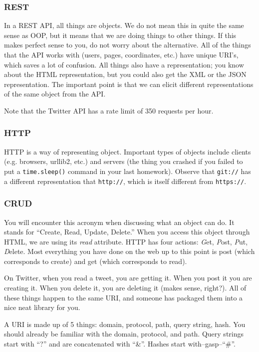 \documentclass[12pt,letter]{article}
\begin{document}
\subsubsection{REST}

In a REST API, all things are objects. We do not mean this in quite
the same sense as OOP, but it means that we are doing things to other
things. If this makes perfect sense to you, do not worry about the
alternative. All of the things that the API works with (users, pages,
coordinates, etc.) have unique
URI's, which saves a lot of confusion. All things also have a
representation; you know about the HTML representation, but you could
also get the XML or the JSON representation. The important point is
that we can elicit different representations of the same object from
the API. 

Note that the Twitter API has a rate limit of 350 requests per hour. 

\subsubsection{HTTP}

HTTP is a way of representing object. Important types of objects
include clients (e.g. browsers, urllib2, etc.) and servers (the thing
you crashed if you failed to put a \texttt{time.sleep()} command in
your last homework). Observe that \texttt{git://} has a different
representation that \texttt{http://}, which is itself different from
\texttt{https://}. 

\subsubsection{CRUD}
You will encounter this acronym when discussing what an object can
do. It stands for ``Create, Read, Update, Delete.'' When you access
this object through HTML, we are using its \emph{read} attribute. HTTP
has four actions: \emph{G}et, \emph{P}ost, \emph{P}ut,
\emph{D}elete. Most everything you have done on the web up to this
point is post (which corresponds to create) and get (which corresponds
to read).

On Twitter, when you read a tweet, you are getting it. When you post
it you are creating it. When you delete
it, you are deleting it (makes sense, right?). All of these things
happen to the same URI, and someone has packaged them into a nice neat
library for you. 

A URI is made up of 5 things: domain, protocol, path, query string,
hash. You should already be familiar with the domain, protocol, and path. Query strings start with ``?'' and are concatenated with
``\&''. Hashes start with--gasp--``\#''. 
\end{document}
